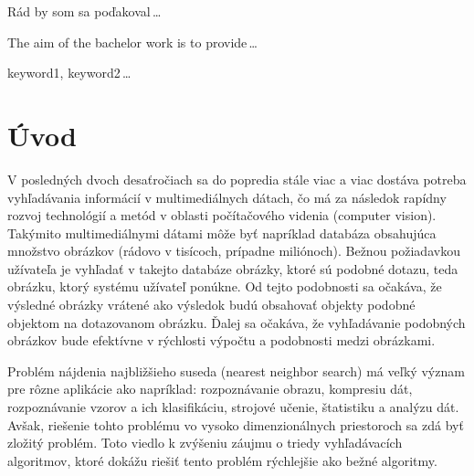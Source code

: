 \documentclass[12pt,a4paper,oneside]{fithesis2}
\begin{document}
  \FrontMatter                    %
    \ThesisTitlePage                %
    \begin{ThesisDeclaration}       %
     \DeclarationText
      \AdvisorName
    \end{ThesisDeclaration}
    \begin{ThesisThanks}            %
      Rád by som sa poďakoval\,\dots
    \end{ThesisThanks}
    \begin{ThesisAbstract}          %
      The aim of the bachelor work is to provide\,\dots
    \end{ThesisAbstract}
    \begin{ThesisKeyWords}          %
      keyword1, keyword2\,\dots
    \end{ThesisKeyWords}
    \tableofcontents                %
  
  \MainMatter                     %
    \chapter{Úvod}          %
    V posledných dvoch desaťročiach sa do popredia stále viac a viac dostáva potreba vyhľadávania informácií v multimediálnych dátach, čo má za následok rapídny rozvoj technológií a metód v oblasti počítačového videnia (computer vision). Takýmito multimediálnymi dátami môže byť napríklad databáza obsahujúca množstvo obrázkov (rádovo v tisícoch, prípadne miliónoch). Bežnou požiadavkou užívateľa je vyhľadať 
v takejto databáze obrázky, ktoré sú podobné dotazu, teda obrázku, ktorý systému užívateľ ponúkne. Od tejto podobnosti sa očakáva, že výsledné obrázky vrátené ako výsledok budú obsahovať objekty podobné objektom na dotazovanom obrázku. Ďalej sa očakáva, že vyhľadávanie podobných obrázkov bude efektívne v rýchlosti výpočtu a podobnosti medzi obrázkami.

Problém nájdenia najbližšieho suseda (nearest neighbor search) má veľký význam pre rôzne aplikácie ako napríklad: rozpoznávanie obrazu, kompresiu dát, rozpoznávanie vzorov a ich klasifikáciu, strojové učenie, štatistiku a analýzu dát. Avšak, riešenie tohto problému vo vysoko dimenzionálnych priestoroch sa zdá byť zložitý problém. Toto viedlo k zvýšeniu záujmu o triedy vyhľadávacích algoritmov, ktoré dokážu riešiť tento problém rýchlejšie ako bežné algoritmy.
\end{document}
